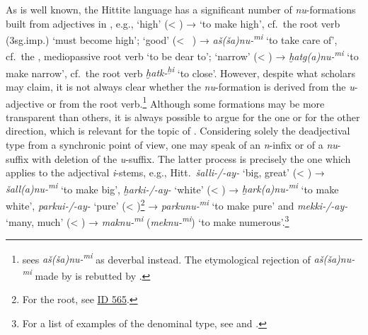 \documentclass[output=paper,colorlinks,citecolor=brown]{langscibook}
\begin{document}
As is well known, the Hittite language has a significant number of \textit{nu}-formations built from adjectives in , e.g.,  ‘high’ (< ) →  ‘to make high’, cf.\ the root verb  (3sg.imp.) ‘must become high’;  ‘good’ (< \mbox{ )} → \textit{aš(ša)nu-\textsuperscript{mi}} ‘to take care of’, cf.\ the , mediopassive root verb  ‘to be dear to’;  ‘narrow’ (< ) → \textit{ḫatg(a)nu-\textsuperscript{mi}} ‘to make narrow’,  cf.\ the root verb \textit{ḫatk-\textsuperscript{ḫi}} ‘to close’. However, despite what scholars may claim, it is not always clear whether the \textit{nu}-formation is derived from the \textit{u}-adjective or from the root verb.\footnote{\citet[156]{Luraghi1992} sees \textit{aš(ša)nu-\textsuperscript{mi}} as deverbal instead. The etymological rejection of \mbox{\textit{aš(ša)nu-\textsuperscript{mi}}} made by \citet[216--218]{Kloekhorst2008} is rebutted by \citet[473, fn.\ 10]{Sasseville2021}.} Although some formations may be more transparent than others, it is always possible to argue for the one or for the other direction, which is relevant for the topic of . Considering solely the deadjectival type from a synchronic point of view, one may speak of an \textit{n}-infix or of a \textit{nu}-suffix with deletion of the \textit{u}-suffix. The latter process is precisely the one which applies to the adjectival \textit{i}-stems, e.g., Hitt.\ \textit{šalli-/-ay-} ‘big, great’ (< ) → \textit{šall(a)nu-\textsuperscript{mi}} ‘to make big’, \textit{ḫarki-/-ay-} ‘white’ (< ) → \textit{ḫark(a)nu\nobreakdash-\textsuperscript{mi}} ‘to make white’, \textit{parkui-/-ay-} ‘pure’ (< )\footnote{For the root, see  \href{http://www.ediana.gwi.uni-muenchen.de/dictionary.php?lemma=565}{ID 565}.} → \textit{parkunu-\textsuperscript{mi}} ‘to make pure’ and \textit{mekki-/-ay-} ‘many, much’ (< ) → \textit{maknu-\textsuperscript{mi}} (\textit{meknu-\textsuperscript{mi}}) ‘to make numerous’.\footnote{For a list of examples of the denominal type, see \citealt[155--156]{Luraghi1992} and \citealt[70--72]{Vanseveren2014}.}
\end{document}

